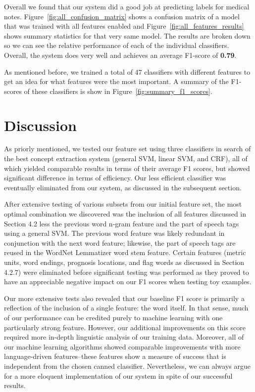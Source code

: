 \documentclass[preprint]{style}
\begin{document}
Overall we found that our system did a good job at predicting labels for medical notes. Figure~\ref{fig:all_confusion_matrix} shows a confusion matrix of a model that was trained with all features enabled and Figure~\ref{fig:all_features_results} shows summary statistics for that very same model. The results are broken down so we can see the relative performance of each of the individual classifiers. Overall, the system does very well and achieves an average F1-score of {\bf 0.79}.

As mentioned before, we trained a total of 47 classifiers with different features to get an idea for what features were the most important. A summary of the F1-scores of these classifiers is show in Figure~\ref{fig:summary_f1_scores}.

\section{Discussion}

As priorly mentioned, we tested our feature set using three classifiers in search of the best concept extraction system (general SVM, linear SVM, and CRF), all of which yielded comparable results in terms of their average F1 scores, but showed significant difference in terms of efficiency. Our less efficient classifier was eventually eliminated from our system, as discussed in the subsequent section. 

After extensive testing of various subsets from our initial feature set, the most optimal combination we discovered was the inclusion of all features discussed in Section 4.2 less the previous word n-gram feature and the part of speech tags using a general SVM. The previous word feature was likely redundant in conjunction with the next word feature; likewise, the part of speech tags are reused in the WordNet Lemmatizer word stem feature. Certain features (metric units, word endings, prognosis locations, and flag words as discussed in Section 4.2.7) were eliminated before significant testing was performed as they proved to have an appreciable negative impact on our F1 scores when testing toy examples. 

Our more extensive tests also revealed that our baseline F1 score is primarily a reflection of the inclusion of a single feature: the word itself.  In that sense, much of our performance can be credited purely to machine learning with one particularly strong feature. However, our additional improvements on this score required more in-depth linguistic analysis of our training data. Moreover, all of our machine learning algorithms showed comparable improvements with more language-driven features--these features show a measure of success that is independent from the chosen canned classifier. Nevertheless, we can always argue for a more eloquent implementation of our system in spite of our successful results.
\end{document}
